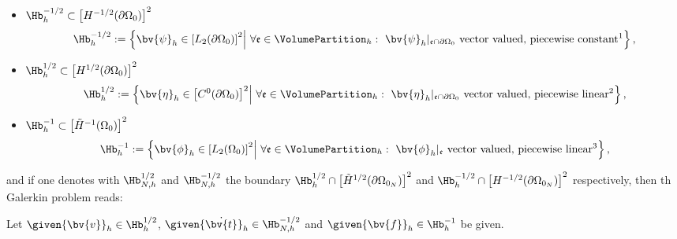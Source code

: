 \begin{itemize}
\item $ \Hb_{h}^{-1/2}\subset\left[ H^{-1/2}(\partial{\Omega_0})\right] ^{2}$
\begin{equation}\nonumber
 \Hb_{h}^{-1/2}:=\left\lbrace \bv{\psi}_{h}\in \left[ L_{2}(\partial{\Omega_0})\right]^{2}\middle|~\forall \mathfrak{e}\in \VolumePartition_{h}:~ \bv{\psi}_{h}\vert_{\mathfrak{e}\cap\partial{\Omega_0}} \text{ vector valued, piecewise  constant\footnotemark }\right\rbrace, 
\end{equation} 
\item $ \Hb_{h}^{1/2}\subset\left[ H^{1/2}(\partial{\Omega_0})\right] ^{2}$
\begin{equation}\nonumber
\Hb_{h}^{1/2}:=\left\lbrace \bv{\eta}_{h}\in \left[ C^{0}(\partial{\Omega_0})\right] ^{2}\middle|~\forall \mathfrak{e}\in \VolumePartition_{h}:~ \bv{\eta}_{h}\vert_{\mathfrak{e}\cap\partial{\Omega_0}} \text{ vector valued, piecewise  linear\footnotemark }\right\rbrace, 
\end{equation} 
\item $ \Hb_{h}^{-1}\subset \left[ \tilde{H}^{-1}({\Omega_0})\right] ^{2}$
\begin{equation}\nonumber
\Hb_{h}^{-1}:=\left\lbrace \bv{\phi}_{h}\in \left[ L_{2}({\Omega_0})\right] ^{2}\middle|~\forall \mathfrak{e}\in \VolumePartition_{h}:~\bv{\phi}_{h}\vert_{\mathfrak{e}} \textnormal{ vector valued,  piecewise } \textnormal{linear\footnotemark}\right\rbrace, 
\end{equation} 
\end{itemize}
and if one denotes with  $\Hb_{N,h}^{1/2} $ and $\Hb_{N,h}^{-1/2}$ the boundary  $\Hb_{h}^{1/2}\cap\left[ \tilde{H}^{1/2}(\partial{\Omega_{0_N}})\right] ^{2} $ and $\Hb_{h}^{-1/2}\cap\left[ H^{-1/2}(\partial{\Omega_{0_N}})\right] ^{2} $ respectively, then th Galerkin problem reads:

Let $\given{\bv{v}}_{h}\in \Hb_{h}^{1/2}$, $\given{\dot{\bv{t}}}_{h}\in  \Hb_{N,h}^{-1/2}$ and $\given{\bv{f}}_{h}\in \Hb_{h}^{-1}$ be given.

